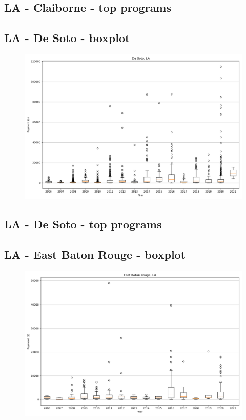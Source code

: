 \subsection*{LA - Claiborne - top programs}

\newpage
\subsection*{LA - De Soto - boxplot}
\begin{figure}[h]
\centering
\includegraphics[width=7in]{../output/boxplots/counties/De Soto-LA_boxplot.png}
\end{figure}


\subsection*{LA - De Soto - top programs}

\newpage
\subsection*{LA - East Baton Rouge - boxplot}
\begin{figure}[h]
\centering
\includegraphics[width=7in]{../output/boxplots/counties/East Baton Rouge-LA_boxplot.png}
\end{figure}


